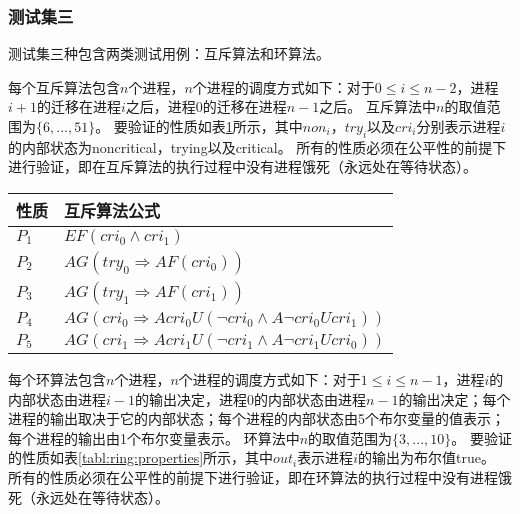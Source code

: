 

\subsubsection{测试集三}
测试集三种包含两类测试用例：互斥算法和环算法。

每个互斥算法包含$n$个进程，$n$个进程的调度方式如下：对于$0\le i\le n-2$，进程$i+1$的迁移在进程$i$之后，进程$0$的迁移在进程$n-1$之后。
互斥算法中$n$的取值范围为$\{6,...,51\}$。
要验证的性质如表\ref{tabl:mutual:properties}所示，其中$non_i$，$try_i$以及$cri_i$分别表示进程$i$的内部状态为\textsf{noncritical}，\textsf{trying}以及\textsf{critical}。
所有的性质必须在公平性的前提下进行验证，即在互斥算法的执行过程中没有进程饿死（永远处在等待状态）。

\begin{table}[h!]
	\small
	\begin{center}
		\begin{tabular}{| l | l |}
			\hline
			\textbf{性质} & \textbf{互斥算法公式}\\
			\hline
			{$P_1$} & $EF (cri_0 \wedge cri_1)$  \\
			\hline
			{$P_2$} &  $AG (try_0 \Rightarrow AF (cri_0))$\\
			\hline
			{$P_3$} &  $AG (try_1 \Rightarrow AF (cri_1))$\\
			
			\hline
			{$P_4$} &  $AG (cri_0 \Rightarrow A cri_0 U (\neg cri_0 \wedge A \neg cri_0 U cri_1))$  \\
			\hline
			{$P_5$} &  $AG (cri_1 \Rightarrow A cri_1 U (\neg cri_1 \wedge A \neg cri_1 U cri_0))$\\
			\hline
		\end{tabular}
	\end{center}
	\label{tabl:mutual:properties}
\end{table}

每个环算法包含$n$个进程，$n$个进程的调度方式如下：对于$1\le i\le n-1$，进程$i$的内部状态由进程$i-1$的输出决定，进程$0$的内部状态由进程$n-1$的输出决定；每个进程的输出取决于它的内部状态；每个进程的内部状态由5个布尔变量的值表示；每个进程的输出由1个布尔变量表示。
环算法中$n$的取值范围为$\{3,...,10\}$。
要验证的性质如表\ref{tabl:ring:properties}所示，其中$out_i$表示进程$i$的输出为布尔值\textsf{true}。
所有的性质必须在公平性的前提下进行验证，即在环算法的执行过程中没有进程饿死（永远处在等待状态）。

